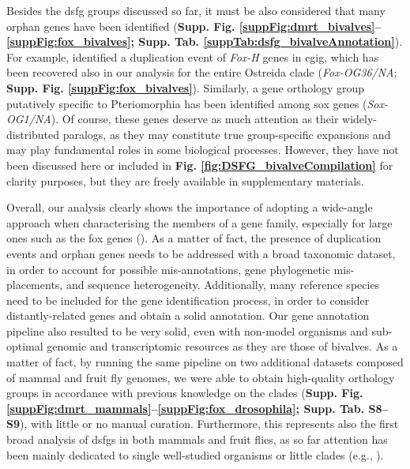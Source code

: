 \documentclass[../main.tex]{subfiles}
\begin{document}
Besides the \gls{dsfg} groups discussed so far, it must be also considered that many orphan genes have been identified (\textbf{Supp. Fig. \ref{suppFig:dmrt_bivalves}--\ref{suppFig:fox_bivalves}; Supp. Tab. \ref{suppTab:dsfg_bivalveAnnotation}}). For example, \textbf{\cite{wu2020identification}} identified a duplication event of \textit{Fox-H} genes in \gls{cgig}, which has been recovered also in our analysis for the entire Ostreida clade (\textit{Fox-OG36/NA}; \textbf{Supp. Fig. \ref{suppFig:fox_bivalves}}). Similarly, a gene orthology group putatively specific to Pteriomorphia has been identified among \gls{sox} genes (\textit{Sox-OG1/NA}). Of course, these genes deserve as much attention as their widely-distributed paralogs, as they may constitute true group-specific expansions and may play fundamental roles in some biological processes. However, they have not been discussed here or included in \textbf{Fig. \ref{fig:DSFG_bivalveCompilation}} for clarity purposes, but they are freely available in supplementary materials.

Overall, our analysis clearly shows the importance of adopting a wide-angle approach when characterising the members of a gene family, especially for large ones such as the \gls{fox} genes (\textbf{\cite{schomburg2022phylogenetic}}). As a matter of fact, the presence of duplication events and orphan genes needs to be addressed with a broad taxonomic dataset, in order to account for possible mis-annotations, gene phylogenetic mis-placements, and sequence heterogeneity. Additionally, many reference species need to be included for the gene identification process, in order to consider distantly-related genes and obtain a solid annotation. Our gene annotation pipeline also resulted to be very solid, even with non-model organisms and sub-optimal genomic and transcriptomic resources as they are those of bivalves. As a matter of fact, by running the same pipeline on two additional datasets composed of mammal and fruit fly genomes, we were able to obtain high-quality orthology groups in accordance with previous knowledge on the clades (\textbf{Supp. Fig. \ref{suppFig:dmrt_mammals}--\ref{suppFig:fox_drosophila}; Supp. Tab. S8--S9}), with little or no manual curation. Furthermore, this represents also the first broad analysis of \glspl{dsfg} in both mammals and fruit flies, as so far attention has been mainly dedicated to single well-studied organisms or little clades (e.g., \textbf{\cite{jackson2010update}}).
\end{document}
